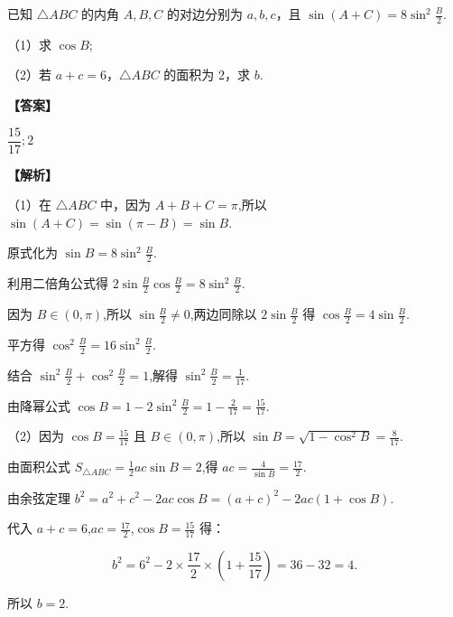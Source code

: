 \documentclass{exam-zh}
\newenvironment{answer}{\par\vspace{0.5em}\noindent\textbf{【答案】}\par}{\par\vspace{1em}}
\newenvironment{solutions}{\par\vspace{0.5em}\noindent\textbf{【解析】}\par}{\par\vspace{1em}}\usepackage{lastpage}
\begin{document}

\begin{question}
已知 $\triangle ABC$ 的内角 $A, B, C$ 的对边分别为 $a, b, c$，且 $\sin(A+C)=8\sin^2\frac{B}{2}$.

（1）求 $\cos B$;

（2）若 $a+c=6$，$\triangle ABC$ 的面积为 2，求 $b$.
\end{question}

\begin{answer}
$\displaystyle\dfrac{15}{17}; 2$
\end{answer}

\begin{solutions}
（1）在 $\triangle ABC$ 中，因为 $A+B+C=\pi$,所以 $\sin(A+C)=\sin(\pi-B)=\sin B$.

原式化为 $\sin B=8\sin^2\frac{B}{2}$.

利用二倍角公式得 $2\sin\frac{B}{2}\cos\frac{B}{2}=8\sin^2\frac{B}{2}$.

因为 $B\in(0,\pi)$,所以 $\sin\frac{B}{2}\neq 0$,两边同除以 $2\sin\frac{B}{2}$ 得 $\cos\frac{B}{2}=4\sin\frac{B}{2}$.

平方得 $\cos^2\frac{B}{2}=16\sin^2\frac{B}{2}$.

结合 $\sin^2\frac{B}{2}+\cos^2\frac{B}{2}=1$,解得 $\sin^2\frac{B}{2}=\displaystyle\frac{1}{17}$.

由降幂公式 $\cos B=1-2\sin^2\frac{B}{2}=1-\displaystyle\frac{2}{17}=\displaystyle\frac{15}{17}$.

（2）因为 $\cos B=\displaystyle\frac{15}{17}$ 且 $B\in(0,\pi)$,所以 $\sin B=\sqrt{1-\cos^2 B}=\displaystyle\frac{8}{17}$.

由面积公式 $S_{\triangle ABC}=\displaystyle\frac{1}{2}ac\sin B=2$,得 $ac=\displaystyle\frac{4}{\sin B}=\displaystyle\frac{17}{2}$.

由余弦定理 $b^2=a^2+c^2-2ac\cos B=(a+c)^2-2ac(1+\cos B)$.

代入 $a+c=6$,$ac=\displaystyle\frac{17}{2}$,$\cos B=\displaystyle\frac{15}{17}$ 得：

$$
b^2=6^2-2\times\displaystyle\frac{17}{2}\times\left(1+\displaystyle\frac{15}{17}\right)=36-32=4.
$$

所以 $b=\boxed{2}$.
\end{solutions}

\end{document}
